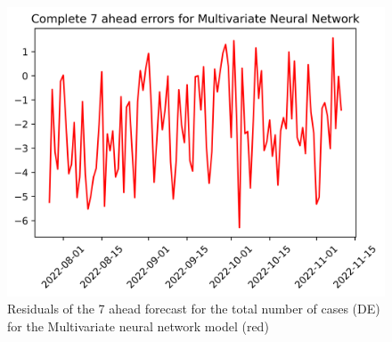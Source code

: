 \begin{figure}
\begin{minipage}{.32\textwidth}
  \label{fig:tot_cases_error_7_mvnn}
\end{minipage}
\begin{minipage}{.32\textwidth}
  \centering
  \includegraphics[width=\linewidth]{pics/7_ah/DE_7_ahead_errors_Multivariate Neural Network.png}
  \caption{Residuals of the 7 ahead forecast for the total number of cases (DE) for the Multivariate neural network model (red)}
  \label{fig:tot_cases_error_7_mvnn_DE}
\end{minipage}

\end{figure}
